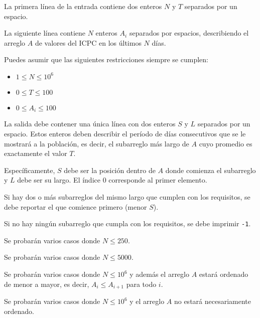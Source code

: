 \documentclass{oci}
\begin{document}
\begin{inputDescription}
  La primera línea de la entrada contiene dos enteros $N$ y $T$ separados por
  un espacio.

  La siguiente línea contiene $N$ enteros $A_i$ separados por espacios,
  describiendo el arreglo $A$ de valores del ICPC en los últimos $N$
  días.

  Puedes asumir que las siguientes restricciones siempre se cumplen:

  \begin{itemize}
  \item $1 \le N \le 10^6$

  \item $0 \le T \le 100$

  \item $0 \le A_i \le 100$
  \end{itemize}
\end{inputDescription}

\begin{outputDescription}
La salida debe contener una única línea con dos enteros $S$ y $L$ separados por
un espacio.
Estos enteros deben describir el período de días consecutivos que se le mostrará
a la población, es decir, el subarreglo más largo de $A$ cuyo promedio es
exactamente el valor $T$.

Específicamente, $S$ debe ser la posición dentro de $A$ donde comienza el
subarreglo y $L$ debe ser su largo.
El índice $0$ corresponde al primer elemento.
 
Si hay dos o más subarreglos del mismo largo que cumplen con los requisitos, se
debe reportar el que comience primero (menor $S$).

Si no hay ningún subarreglo que cumpla con los requisitos, se debe imprimir
\texttt{-1}.
\end{outputDescription}

\begin{scoreDescription}
  Se probarán varios casos donde $N \le 250$.
 
  Se probarán varios casos donde $N \le 5000$.
 
  Se probarán varios casos donde $N \le 10^6$ y además el arreglo $A$ estará ordenado de
  menor a mayor, es decir, $A_i \le A_{i+1}$ para todo $i$.
 
  Se probarán varios casos donde $N \le 10^6$ y el arreglo $A$ no estará
  necesariamente ordenado.
\end{scoreDescription}

\begin{sampleDescription}
\end{sampleDescription}
\end{document}
